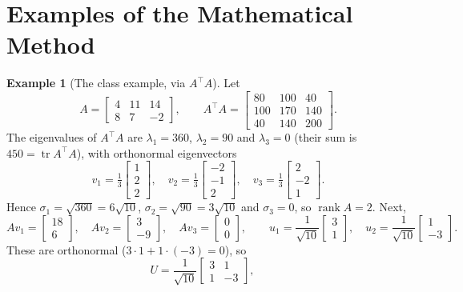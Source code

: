 \documentclass[12pt,a4paper]{report}
\newcommand{\T}{^{\top}}
\DeclareMathOperator{\rank}{rank}
\DeclareMathOperator{\tr}{tr}
\theoremstyle{plain}
\theoremstyle{definition}
\theoremstyle{remark}
\theoremstyle{definition}
\newtheorem{example}{Example}[chapter]
\begin{document}
\section{Examples of the Mathematical Method}

\begin{example}[The class example, via $A\T A$]\label{ex:class}
Let
\[
A=\begin{bmatrix}4&11&14\\8&7&-2\end{bmatrix},\qquad
A\T A=\begin{bmatrix}80&100&40\\100&170&140\\40&140&200\end{bmatrix}.
\]
The eigenvalues of $A\T A$ are $\lambda_1=360$, $\lambda_2=90$ and $\lambda_3=0$ (their sum is $450=\tr A\T A$), with orthonormal eigenvectors
\[
v_1=\tfrac13\begin{bmatrix}1\\2\\2\end{bmatrix},\quad
v_2=\tfrac13\begin{bmatrix}-2\\-1\\2\end{bmatrix},\quad
v_3=\tfrac13\begin{bmatrix}2\\-2\\1\end{bmatrix}.
\]
Hence $\sigma_1=\sqrt{360}=6\sqrt{10}$, $\sigma_2=\sqrt{90}=3\sqrt{10}$ and $\sigma_3=0$, so $\rank A=2$. Next,
\[
Av_1=\begin{bmatrix}18\\6\end{bmatrix},\quad Av_2=\begin{bmatrix}3\\-9\end{bmatrix},\quad Av_3=\begin{bmatrix}0\\0\end{bmatrix},
\qquad
u_1=\frac{1}{\sqrt{10}}\begin{bmatrix}3\\1\end{bmatrix},\quad u_2=\frac1{\sqrt{10}}\begin{bmatrix}1\\-3\end{bmatrix}.
\]
These are orthonormal ($3\cdot1+1\cdot(-3)=0$), so
\[
U=\frac1{\sqrt{10}}\begin{bmatrix}3&1\\1&-3\end{bmatrix},\quad
\]
\end{example}
\end{document}
